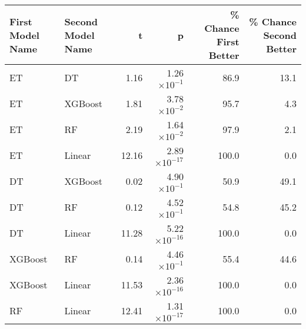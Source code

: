 \begin{tabular}{llrrrr}
\toprule
First Model Name & Second Model Name &     t &            p &  \% Chance First Better &  \% Chance Second Better \\
\midrule
              ET &                DT &  1.16 & 1.26$\times10^{-1}$ &                  86.9 &                   13.1 \\
              ET &           XGBoost &  1.81 & 3.78$\times10^{-2}$ &                  95.7 &                    4.3 \\
              ET &                RF &  2.19 & 1.64$\times10^{-2}$ &                  97.9 &                    2.1 \\
              ET &            Linear & 12.16 & 2.89$\times10^{-17}$ &                 100.0 &                    0.0 \\
              DT &           XGBoost &  0.02 & 4.90$\times10^{-1}$ &                  50.9 &                   49.1 \\
              DT &                RF &  0.12 & 4.52$\times10^{-1}$ &                  54.8 &                   45.2 \\
              DT &            Linear & 11.28 & 5.22$\times10^{-16}$ &                 100.0 &                    0.0 \\
         XGBoost &                RF &  0.14 & 4.46$\times10^{-1}$ &                  55.4 &                   44.6 \\
         XGBoost &            Linear & 11.53 & 2.36$\times10^{-16}$ &                 100.0&                    0.0 \\
              RF &            Linear & 12.41 & 1.31$\times10^{-17}$ &                 100.0 &                    0.0 \\
\bottomrule
\end{tabular}
